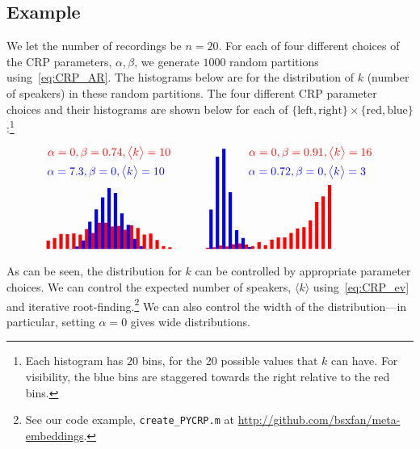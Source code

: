 \documentclass[a4paper,oneside,12pt,english]{report}
\def\expp#1{\bigl\langle#1\bigr\rangle}
\begin{document}
\subsection{Example}
We let the number of recordings be $n=20$. For each of four different choices of the CRP parameters, $\alpha,\beta$, we generate $1000$ random partitions using~\eqref{eq:CRP_AR}. The histograms below are for the distribution of $k$ (number of speakers) in these random partitions. The four different CRP parameter choices and their histograms are shown below for each of  $\{\text{left},\text{right}\}\times\{\text{red},\text{blue}\}$:\footnote{Each histogram has $20$ bins, for the 20 possible values that $k$ can have. For visibility, the blue bins are staggered towards the right relative to the red bins.}
$$
\begin{tikzpicture}[ycomb,xscale = 0.1,yscale = 10]
\draw[color=red,line width=3pt] plot coordinates{(1,0.0260) (3,0.0340) (5,0.0470) (7,0.0460) (9,0.0490) (11,0.0450) (13,0.0620) (15,0.0500) (17,0.0820) (19,0.0820) (21,0.0700) (23,0.0720) (25,0.0600) (27,0.0740) (29,0.0660) (31,0.0450) (33,0.0480) (35,0.0280) (37,0.0090) (39,0.0050)  };
\draw[color=blue,line width=3pt] plot coordinates{(2,0.0000) (4,0.0000) (6,0.0000) (8,0.0010) (10,0.0080) (12,0.0270) (14,0.0850) (16,0.1240) (18,0.1610) (20,0.1900) (22,0.1750) (24,0.1110) (26,0.0750) (28,0.0320) (30,0.0090) (32,0.0010) (34,0.0010) (36,0.0000) (38,0.0000) (40,0.0000) };
\node[align=left,red] at(20,0.3){$\alpha=0,\beta=0.74,\expp{k}=10$};
\node[align=left,blue] at(19,0.24){$\alpha=7.3,\beta=0,\expp{k}=10$};
\end{tikzpicture}
\;\;\;\;\;\;\;\;\;\;
\begin{tikzpicture}[ycomb,xscale = 0.1,yscale = 10]
\draw[color=red,line width=3pt] plot coordinates{(1,0.0040) (3,0.0050) (5,0.0110) (7,0.0080) (9,0.0150) (11,0.0170) (13,0.0140) (15,0.0090) (17,0.0220) (19,0.0120) (21,0.0290) (23,0.0360) (25,0.0360) (27,0.0500) (29,0.0640) (31,0.0680) (33,0.0890) (35,0.1470) (37,0.1640) (39,0.2000)  };
\draw[color=blue,line width=3pt] plot coordinates{(2,0.1230) (4,0.2880) (6,0.3130) (8,0.1770) (10,0.0590) (12,0.0340) (14,0.0060) (16,0.0000) (18,0.0000) (20,0.0000) (22,0.0000) (24,0.0000) (26,0.0000) (28,0.0000) (30,0.0000) (32,0.0000) (34,0.0000) (36,0.0000) (38,0.0000) (40,0.0000)  };
\node[align=left,red] at(33,0.3){$\alpha=0,\beta=0.91,\expp{k}=16$};
\node[align=left,blue] at(32,0.24){$\alpha=0.72,\beta=0,\expp{k}=3$};
\end{tikzpicture}
$$
As can be seen, the distribution for $k$ can be controlled by appropriate parameter choices. We can control the expected number of speakers, $\expp{k}$ using~\eqref{eq:CRP_ev} and iterative root-finding.\footnote{See our code example, \texttt{create\_PYCRP.m} at \url{http://github.com/bsxfan/meta-embeddings}.} We can also control the width of the distribution---in particular, setting $\alpha=0$ gives wide distributions.
\end{document}
